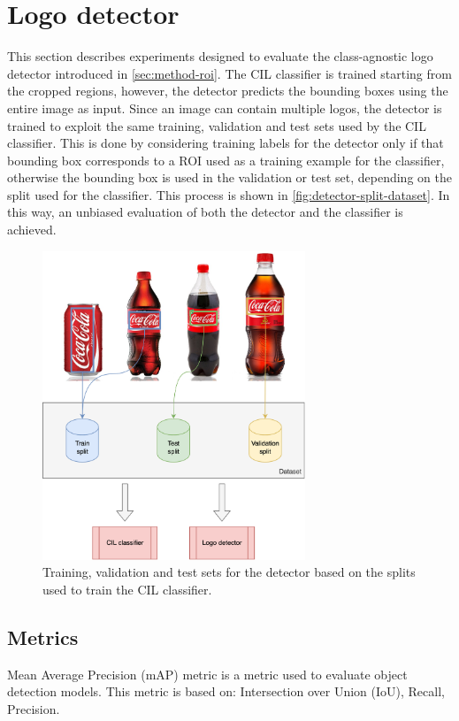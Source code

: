 \section{Logo detector}
\label{sec:exp-det}
This section describes experiments designed to evaluate the class-agnostic logo detector introduced in \autoref{sec:method-roi}.
The CIL classifier is trained starting from the cropped regions,
however, the detector predicts the bounding boxes using the entire image as input.
Since an image can contain multiple logos, the detector is trained to exploit the same training, validation and test sets used by the CIL classifier.
This is done by considering training labels for the detector only if that bounding box corresponds to a ROI used as a training example for the classifier, otherwise the bounding box is used in the validation or test set, depending on the split used for the classifier.
This process is shown in \autoref{fig:detector-split-dataset}.
In this way, an unbiased evaluation of both the detector and the classifier is achieved.

\begin{figure}[H]
	\centering
    \includegraphics[width=0.7\textwidth]{images/logos-split.drawio.png}
	\caption{Training, validation and test sets for the detector based on the splits used to train the CIL classifier.}%
	\label{fig:detector-split-dataset}%
\end{figure}

\subsection{Metrics}
Mean Average Precision (mAP) metric is a metric used to evaluate object detection models. This metric is based on: Intersection over Union (IoU), Recall, Precision.


